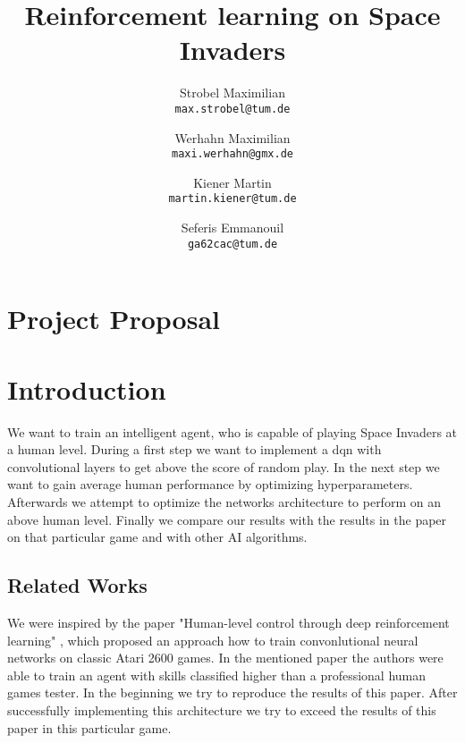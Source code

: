 \documentclass[10pt,twocolumn,letterpaper]{article}
\begin{document}
\title{Reinforcement learning on Space Invaders}

\author{Strobel Maximilian\\
{\tt\small max.strobel@tum.de}
\and
Werhahn Maximilian\\
{\tt\small maxi.werhahn@gmx.de}
\and
Kiener Martin\\
{\tt\small martin.kiener@tum.de}
\and
Seferis Emmanouil \\
{\tt\small ga62cac@tum.de}
}


\maketitle

%
%
\section*{Project Proposal}

\section{Introduction}
We want to train an intelligent agent, who is capable of playing Space Invaders at a human level. During a first step we want to implement a \gls{dqn} with convolutional layers to get above the score of random play. In the next step we want to gain average human performance by optimizing hyperparameters. Afterwards we attempt to optimize the networks architecture to perform on an above human level. Finally we compare our results with the results in the paper on that particular game and with other AI algorithms.
    
\subsection{Related Works}
We were inspired by the paper "Human-level control through deep reinforcement learning" \cite{Mnih2015}, which proposed an approach how to train convonlutional neural networks on classic Atari 2600 games. In the mentioned paper the authors were able to train an agent with skills classified higher than a professional human games tester. In the beginning we try to reproduce the results of this paper. After successfully implementing this architecture we try to exceed the results of this paper in this particular game.

    	 
\end{document}
